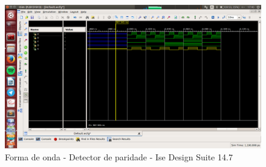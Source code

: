 \documentclass[12pts]{article}
\begin{document}
\begin{itemize}
\begin{figure}[!htb]
  \centering
  \includegraphics[scale=0.34]{imagens/parImparOnda}
  \caption{Forma de onda - Detector de paridade - Ise Design Suite 14.7}
  \label{figRotulo}
\end{figure}				
	
\end{itemize}
\end{document}
